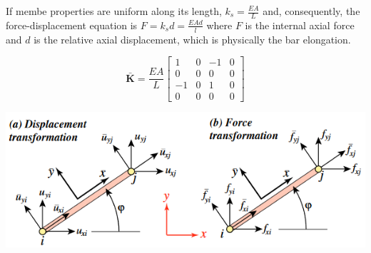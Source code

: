 \documentclass{article}
\begin{document}
\begin{multicols*}{2}
    If membe properties are uniform along its length, $k_s=\frac{EA}{L}$ and,
    consequently, the force-displacement equation is $F=k_sd=\frac{EAd}{l}$ 
    where $F$ is the internal axial force and $d$ is the relative axial displacement,
    which is physically the bar elongation.\par 
    \begin{equation*}
        \bar{\textbf{K}}=\frac{EA}{L}
        \begin{bmatrix}
            1 & 0 & -1 & 0\\
            0 & 0 & 0 & 0 \\
            -1 & 0 & 1 & 0\\
            0 & 0 & 0 & 0
        \end{bmatrix}
    \end{equation*}

    \includegraphics[width=\linewidth]{Figures/DSM1_phi.png}
    

\end{multicols*}
\end{document}
